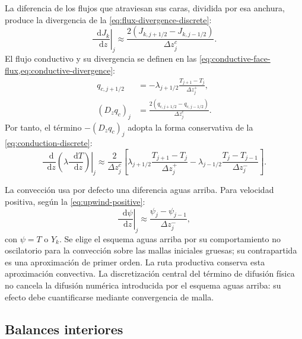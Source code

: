 \documentclass[12pt,a4paper,twoside,openany]{book}
\newcommand{\dd}{\mathop{}\!\mathrm{d}}
\begin{document}
La diferencia de los flujos que atraviesan sus caras, dividida por esa anchura,
produce la divergencia de la \cref{eq:flux-divergence-discrete}:
\begin{equation}
  \left.\frac{\dd J_k}{\dd z}\right|_j
  \approx \frac{2\left(J_{k,j+1/2}-J_{k,j-1/2}\right)}
  {\Delta z_j^c}.
  \label{eq:flux-divergence-discrete}
\end{equation}
El flujo conductivo y su divergencia se definen en las
\cref{eq:conductive-face-flux,eq:conductive-divergence}:
\begin{align}
 q_{c,j+1/2}&=-\lambda_{j+1/2}
 \frac{T_{j+1}-T_j}{\Delta z_j^+},
 \label{eq:conductive-face-flux}\\
 (D_zq_c)_j&=\frac{2(q_{c,j+1/2}-q_{c,j-1/2})}{\Delta z_j^c}.
 \label{eq:conductive-divergence}
\end{align}
Por tanto, el término \(-(D_zq_c)_j\) adopta la forma conservativa de la \cref{eq:conduction-discrete}:
\begin{equation}
  \left.\frac{\dd}{\dd z}\left(\lambda\frac{\dd T}{\dd z}\right)\right|_j
  \approx \frac{2}{\Delta z_j^c}
  \left[
  \lambda_{j+1/2}\frac{T_{j+1}-T_j}{\Delta z_j^+}
  -\lambda_{j-1/2}\frac{T_j-T_{j-1}}{\Delta z_j^-}
  \right].
  \label{eq:conduction-discrete}
\end{equation}

La convección usa por defecto una diferencia aguas arriba. Para velocidad
positiva, según la \cref{eq:upwind-positive}:
\begin{equation}
  \left.\frac{\dd \psi}{\dd z}\right|_j
  \approx\frac{\psi_j-\psi_{j-1}}{\Delta z_j^-},
  \label{eq:upwind-positive}
\end{equation}
con \(\psi=T\) o \(Y_k\). Se elige el esquema aguas arriba por su
comportamiento no oscilatorio para la convección sobre las mallas iniciales
gruesas; su contrapartida es una aproximación de primer orden.
La ruta productiva conserva esta aproximación convectiva. La discretización central del término de difusión
física no cancela la difusión numérica introducida por el esquema aguas arriba:
su efecto debe cuantificarse mediante convergencia de malla.

\subsection{Balances interiores}
\end{document}
